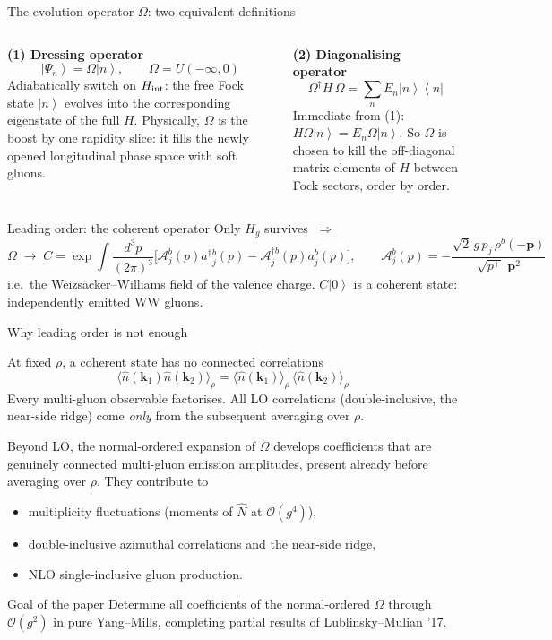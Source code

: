 \documentclass[9pt,aspectratio=169]{beamer}
\newcommand{\hl}[1]{\textcolor{acc}{#1}}
\newcommand{\hb}[1]{\textcolor{blu}{#1}}
\newcommand{\pp}{p^{+}}
\newcommand{\dthree}[1]{\frac{d^{3}#1}{(2\pi)^{3}}}
\newcommand{\Om}{\Omega}
\newcommand{\ket}[1]{\left|#1\right\rangle}
\newcommand{\bra}[1]{\left\langle#1\right|}
\newcommand{\Hg}{H_{g}}
\newcommand{\ad}{a^{\dagger}}
\begin{document}
\begin{frame}{The evolution operator $\Omega$: two equivalent definitions}
\begin{columns}[T,onlytextwidth]
\textbf{(1) Dressing operator}
\[
\ket{\Psi_{n}}=\Om\ket{n},\qquad \Om=U(-\infty,0)
\]
{\small Adiabatically switch on $H_{\rm int}$: the free Fock state $\ket n$ evolves into
the corresponding eigenstate of the full $H$. Physically, $\Om$ \hl{is the boost}
by one rapidity slice: it fills the newly opened longitudinal phase space with soft gluons.}

\textbf{(2) Diagonalising operator}
\[
\Om^{\dagger}H\,\Om=\sum_{n}E_{n}\ket{n}\bra{n}
\]
{\small Immediate from (1): $H\Om\ket n=E_n\Om\ket n$. So $\Om$ is chosen to kill the
off-diagonal matrix elements of $H$ between Fock sectors, order by order.}
\end{columns}
\medskip
\begin{alertblock}{Leading order: the coherent operator}
Only $\Hg$ survives $\;\Rightarrow$
\[
\Om\;\to\;C=\exp\!\int\!\dthree{p}\Big[\mathcal{A}^{b}_{j}(p)\ad{}^{b}_{j}(p)-\mathcal{A}^{\dagger b}_{j}(p)a^{b}_{j}(p)\Big],
\qquad
\mathcal{A}^{b}_{j}(p)=-\frac{\sqrt2\,g\,p_{j}\,\rho^{b}(-\bm p)}{\sqrt{\pp}\;\bm p^{2}}
\]
i.e.\ the \hl{Weizs\"acker--Williams} field of the valence charge. $C\ket0$ is a
\hb{coherent state}: independently emitted WW gluons.
\end{alertblock}
\end{frame}

\begin{frame}{Why leading order is not enough}
\begin{block}{At fixed $\rho$, a coherent state has no connected correlations}
\[
\langle \hat n(\bm k_1)\hat n(\bm k_2)\rangle_{\rho}
=\langle \hat n(\bm k_1)\rangle_{\rho}\,\langle \hat n(\bm k_2)\rangle_{\rho}
\]
Every multi-gluon observable \hl{factorises}.
All LO correlations (double-inclusive, the near-side ridge) come \emph{only}
from the subsequent \hb{averaging over $\rho$}.
\end{block}
\medskip
Beyond LO, the normal-ordered expansion of $\Om$ develops coefficients that are
\hl{genuinely connected multi-gluon emission amplitudes, present already before
averaging over $\rho$}. They contribute to
\begin{itemize}
  \item multiplicity \hb{fluctuations} (moments of $\hat N$ at $\mathcal{O}(g^{4})$),
  \item \hb{double-inclusive azimuthal correlations} and the near-side ridge,
  \item \hb{NLO single-inclusive} gluon production.
\end{itemize}
\medskip
\begin{alertblock}{Goal of the paper}
Determine \hl{all} coefficients of the normal-ordered $\Om$ through $\mathcal{O}(g^{2})$
in pure Yang--Mills, completing partial results of Lublinsky--Mulian '17.
\end{alertblock}
\end{frame}
\end{document}
